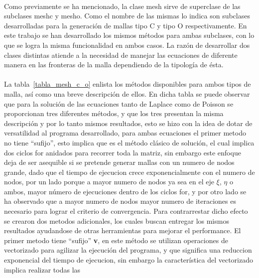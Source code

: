 \documentclass[letterpaper, openright, 12pt]{book}
\begin{document}
    \paragraph*{}
    Como previamente se ha mencionado, la clase mesh sirve de superclase de
    las subclases mesh\textunderscore c y mesh\textunderscore o. Como el
    nombre de las mismas lo indica son subclases desarrolladas para la
    generación de mallas tipo C y tipo O respectivamente. En este trabajo se
    han desarrollado los mismos métodos para ambas subclases, con lo que se
    logra la misma funcionalidad en ambos casos. La razón de desarrollar dos
    clases distintas atiende a la necesidad de manejar las ecuaciones de
    diferente manera en las fronteras de la malla dependiendo de la
    tipología de ésta.

    \paragraph*{}
    La tabla~\ref{tabla_mesh_c_o} enlista los métodos
    disponibles para ambos tipos de malla, así como una breve descripción de
    ellos. En dicha tabla se puede observar que para la solución de las
    ecuaciones tanto de Laplace como de Poisson se proporcionan tres
    diferentes métodos, y que los tres presentan la misma descripción y por
    lo tanto mismos resultados, esto se hizo con la idea de dotar de
    versatilidad al programa desarrollado, para ambas ecuaciones el primer
    metodo no tiene ``sufijo'', esto implica que es el método clásico de
    solución, el cual implica dos ciclos for anidados para recorrer toda la
    matriz, sin embargo este enfoque deja de ser asequible si se pretende
    generar mallas con un numero de nodos grande, dado que el tiempo de
    ejecucion crece exponencialmente con el numero de nodos, por un lado porque
    a mayor numero de nodos ya sea en el eje $\xi$, $\eta$ o ambos, mayor
    número de ejecuciones dentro de los ciclos for, y por otro lado se
    ha observado que a mayor numero de nodos mayor numero de iteraciones
    es necesario para lograr el criterio de convergencia. Para
    contrarrestar dicho efecto se crearon dos metodos adicionales, los
    cuales buscan entregar los mismos resultados ayudandose de otras
    herramientas para mejorar el performance. El primer metodo tiene
    ``sufijo'' \textbf{\textunderscore v}, en este método se utilizan
    operaciones de vectorizado para agilizar la ejecución del programa, y
    que significa una reduccion exponencial del tiempo de ejecucion, sin
    embargo la característica del vectorizado implica realizar todas las
\end{document}

